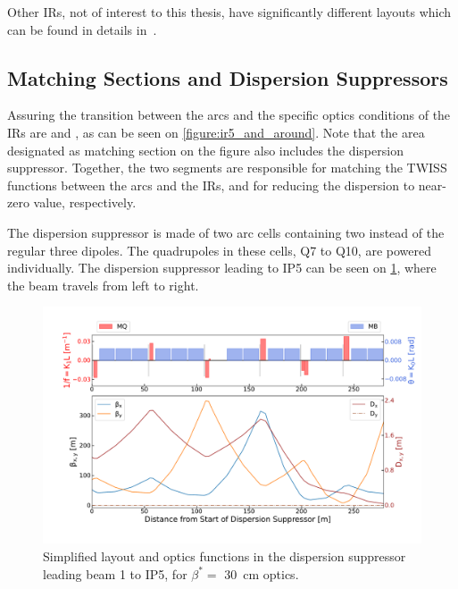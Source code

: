 Other IRs, not of interest to this thesis, have significantly different layouts which can be found in details in~\cite{BOOK:Bruning:LHC_Design_Report_Main_Ring,PHD:Vanbavinckhove}.

\subsection{Matching Sections and Dispersion Suppressors}
\label{subsection:matching_sections_dispersion_suppressors}

Assuring the transition between the arcs and the specific optics conditions of the IRs are  and , as can be seen on \cref{figure:ir5_and_around}.
Note that the area designated as matching section on the figure also includes the dispersion suppressor.
Together, the two segments are responsible for matching the TWISS functions between the arcs and the IRs, and for reducing the dispersion to near-zero value, respectively.

The dispersion suppressor is made of two arc cells containing two instead of the regular three dipoles.
The quadrupoles in these cells, Q\num{7} to Q\num{10}, are powered individually.
The dispersion suppressor leading to IP\num{5} can be seen on \cref{figure:lhc_dispersion_suppressor}, where the beam travels from left to right.

\begin{figure}[!hbt]
  \centering
  \includegraphics*[width=0.99\linewidth]{Figures/Optics_Measurements_Corrections_at_LHC/lhc_dispersion_suppressor.pdf}
  \caption{Simplified layout and optics functions in the dispersion suppressor leading beam \num{1} to IP\num{5}, for \(\beta^{\ast} =\) \qty{30}{\centi\meter} optics.}
  \label{figure:lhc_dispersion_suppressor}
\end{figure}

